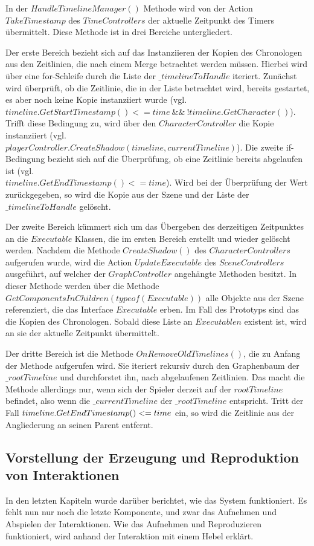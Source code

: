 In der $HandleTimelineManager()$ Methode wird von der Action $TakeTimestamp$ des $TimeControllers$ der aktuelle Zeitpunkt des Timers übermittelt. Diese Methode ist in drei Bereiche untergliedert. 

Der erste Bereich bezieht sich auf das Instanziieren der Kopien des Chronologen aus den Zeitlinien, die nach einem Merge betrachtet werden müssen. Hierbei wird über eine for-Schleife durch die Liste der $\_timelineToHandle$ iteriert.
Zunächst wird überprüft, ob die Zeitlinie, die in der Liste betrachtet wird, bereits gestartet, es aber noch keine Kopie instanziiert wurde (vgl. $timeline.GetStartTimestamp() <= time ~\&\&~ !timeline.GetCharacter()$). Trifft diese Bedingung zu, wird über den $CharacterController$ die Kopie instanziiert (vgl.\\ $playerController.CreateShadow(timeline, currentTimeline)$). 
Die zweite if-Bedingung bezieht sich auf die Überprüfung, ob eine Zeitlinie bereits abgelaufen ist (vgl.\\$timeline.GetEndTimestamp() <= time$). Wird bei der Überprüfung der Wert  zurückgegeben, so wird die Kopie aus der Szene und der Liste der $\_timelineToHandle$ gelöscht.

Der zweite Bereich kümmert sich um das Übergeben des derzeitigen Zeitpunktes an die $Executable$ Klassen, die im ersten Bereich erstellt und wieder gelöscht werden. Nachdem die Methode $CreateShadow()$ des $CharacterControllers$ aufgerufen wurde, wird die Action $UpdateExecutable$ des $SceneControllers$ ausgeführt, auf welcher der $GraphController$ angehängte Methoden besitzt. In dieser Methode werden über die Methode $GetComponentsInChildren(typeof(Executable))$ alle Objekte aus der Szene referenziert, die das Interface $Executable$ erben. Im Fall des Prototyps sind das die Kopien des Chronologen. Sobald diese Liste an $Executablen$ existent ist, wird an sie der aktuelle Zeitpunkt übermittelt.

Der dritte Bereich ist die Methode $OnRemoveOldTimelines()$, die zu Anfang der Methode aufgerufen wird. Sie iteriert rekursiv durch den Graphenbaum der $\_rootTimeline$ und durchforstet ihn, nach abgelaufenen Zeitlinien. Das macht die Methode allerdings nur, wenn sich der Spieler derzeit auf der $rootTimeline$ befindet, also wenn die $\_currentTimeline$ der $\_rootTimeline$ entspricht. Tritt der Fall $\\timeline.GetEndTimestamp() <= time$ ein, so wird die Zeitlinie aus der Angliederung an seinen Parent entfernt.

\subsection{Vorstellung der Erzeugung und Reproduktion von Interaktionen}\label{sec:interactions_reproduction}
In den letzten Kapiteln wurde darüber berichtet, wie das System funktioniert. Es fehlt nun nur noch die letzte Komponente, und zwar das Aufnehmen und Abspielen der Interaktionen. Wie das Aufnehmen und Reproduzieren funktioniert, wird anhand der Interaktion mit einem Hebel erklärt.

